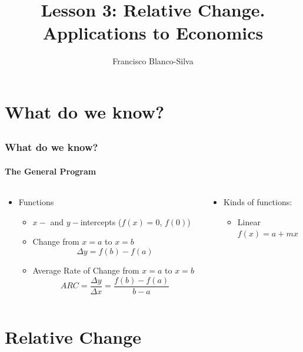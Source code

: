 \documentclass[9pt,xcolor=x11names,compress]{beamer}
\title{Lesson 3: Relative Change.  Applications to Economics}
\author[Francisco Blanco-Silva]{Francisco Blanco-Silva}
\institute[USC]{University of South Carolina}
\date{
	\begin{tikzpicture} 
    \draw [blue!75!black, rotate=90]
    [l-system={rule set={F -> FF-[-F+F]+[+F-F]}, axiom=F, order=4, step=2pt, 
        randomize step percent=25, angle=30, randomize angle percent=5}]
    lindenmayer system; 
	\end{tikzpicture}
}
\begin{document}
\frame{\titlepage}

\section{What do we know?}
\subsection{}

\begin{frame}[t]
\frametitle{What do we know?}
\framesubtitle{The General Program}
\begin{columns}[T]
\begin{column}{0.6\linewidth}
\begin{itemize}
\item Functions
\begin{itemize}
\item $x-$ and $y-$\alert{intercepts} ($f(x)=0$, $f(0)$)
\item \alert{Change} from $x=a$ to $x=b$ 
\begin{equation*}
	\Delta y = f(b)-f(a)
\end{equation*}
\item \alert{Average Rate of Change} from $x=a$ to $x=b$
\begin{equation*}
ARC=\frac{\Delta y}{\Delta x}=\frac{f(b)-f(a)}{b-a} 
\end{equation*}
\end{itemize}
\end{itemize}
\end{column}
\pause
\begin{column}{0.4\linewidth}
\begin{itemize}
	\item Kinds of functions:
	\begin{itemize}
		\item \alert{Linear} \\ $f(x)=a + mx$
	\end{itemize}
\end{itemize}
\end{column}
\end{columns}
\end{frame}

\section{Relative Change}
\subsection{}
\end{document}
